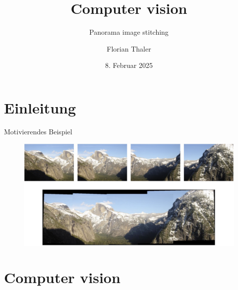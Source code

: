 \documentclass[aspectratio=43, 11pt]{beamer}
\title[Short Title]{Computer vision}
\subtitle{Panorama image stitching}
\author{Florian Thaler}
\date{8. Februar 2025}
\institute{Institute of Visual Computing}
\begin{document}

	\begin{frame}[plain]
  	\maketitle
	\end{frame}



	\section{Einleitung}
	
		\begin{frame}{Motivierendes Beispiel}
	  	\begin{figure}
				\includegraphics[width=1.0\textwidth]{stitching_1}
			\end{figure}
		\end{frame}


	\section{Computer vision}
\end{document}
